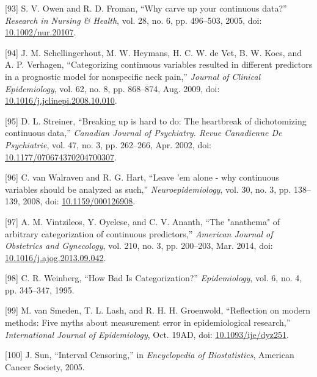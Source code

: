 \documentclass[12pt,PhD,twoside,openright]{muthesis}
\newenvironment{cslreferences}%
  {}%
  {\par}
\begin{document}
\begin{cslreferences}
\leavevmode\hypertarget{ref-owen_why_2005}{}%
{[}93{]} S. V. Owen and R. D. Froman, ``Why carve up your continuous data?'' \emph{Research in Nursing \& Health}, vol. 28, no. 6, pp. 496--503, 2005, doi: \href{https://doi.org/10.1002/nur.20107}{10.1002/nur.20107}.

\leavevmode\hypertarget{ref-schellingerhout_categorizing_2009}{}%
{[}94{]} J. M. Schellingerhout, M. W. Heymans, H. C. W. de Vet, B. W. Koes, and A. P. Verhagen, ``Categorizing continuous variables resulted in different predictors in a prognostic model for nonspecific neck pain,'' \emph{Journal of Clinical Epidemiology}, vol. 62, no. 8, pp. 868--874, Aug. 2009, doi: \href{https://doi.org/10.1016/j.jclinepi.2008.10.010}{10.1016/j.jclinepi.2008.10.010}.

\leavevmode\hypertarget{ref-streiner_breaking_2002}{}%
{[}95{]} D. L. Streiner, ``Breaking up is hard to do: The heartbreak of dichotomizing continuous data,'' \emph{Canadian Journal of Psychiatry. Revue Canadienne De Psychiatrie}, vol. 47, no. 3, pp. 262--266, Apr. 2002, doi: \href{https://doi.org/10.1177/070674370204700307}{10.1177/070674370204700307}.

\leavevmode\hypertarget{ref-van_walraven_leave_2008}{}%
{[}96{]} C. van Walraven and R. G. Hart, ``Leave 'em alone - why continuous variables should be analyzed as such,'' \emph{Neuroepidemiology}, vol. 30, no. 3, pp. 138--139, 2008, doi: \href{https://doi.org/10.1159/000126908}{10.1159/000126908}.

\leavevmode\hypertarget{ref-vintzileos_anathema_2014}{}%
{[}97{]} A. M. Vintzileos, Y. Oyelese, and C. V. Ananth, ``The "anathema" of arbitrary categorization of continuous predictors,'' \emph{American Journal of Obstetrics and Gynecology}, vol. 210, no. 3, pp. 200--203, Mar. 2014, doi: \href{https://doi.org/10.1016/j.ajog.2013.09.042}{10.1016/j.ajog.2013.09.042}.

\leavevmode\hypertarget{ref-weinberg_how_1995}{}%
{[}98{]} C. R. Weinberg, ``How Bad Is Categorization?'' \emph{Epidemiology}, vol. 6, no. 4, pp. 345--347, 1995.

\leavevmode\hypertarget{ref-van_smeden_reflection_2019}{}%
{[}99{]} M. van Smeden, T. L. Lash, and R. H. H. Groenwold, ``Reflection on modern methods: Five myths about measurement error in epidemiological research,'' \emph{International Journal of Epidemiology}, Oct. 19AD, doi: \href{https://doi.org/10.1093/ije/dyz251}{10.1093/ije/dyz251}.

\leavevmode\hypertarget{ref-sun_interval_2005}{}%
{[}100{]} J. Sun, ``Interval Censoring,'' in \emph{Encyclopedia of Biostatistics}, American Cancer Society, 2005.


\end{cslreferences}
\end{document}
